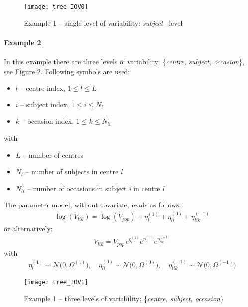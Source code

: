\begin{figure}[htb!]
\centering
  \texttt{[image: tree\_IOV0]}
 \caption{Example 1 -- single level of variability: \textit{subject}-- level}
 \label{tree_IOV0}
\end{figure}

\paragraph{Example 2}
In this example there are three levels of variability: \{\textit{centre, subject, occasion}\}, see Figure \ref{tree_IOV1}. Following symbols are used:
\begin{itemize}
\item
$l$ -- centre index, $1\le l \le L$
\item
$i$ -- subject index, $1\le i \le N_l$
\item
$k$ -- occasion index, $1\le k \le N_{li}$
\end{itemize} 
with
\begin{itemize}
\item
$L$ -- number of centres
\item
$N_l$ -- number of subjects in centre \textit{l}
\item
$N_{li}$ -- number of occasions in subject \textit{i} in centre \textit{l}
\end{itemize} 
The parameter model, without covariate, reads as follows:
\begin{align*}
& \log(V_{lik}) = \log(V_{pop}) + \eta_l^{(1)} + \eta_{li}^{(0)} + \eta_{lik}^{(-1)}  
\end{align*} 
or alternatively:
\begin{align*}
& V_{lik} = V_{pop} \, e^{\eta_l^{(1)}} e^{\eta_{li}^{(0)}} e^{\eta_{lik}^{(-1)}}  
\end{align*} 
with
\begin{align*}
 & \eta_l^{(1)} \sim \mathcal{N}\big(0,\Omega^{(1)}\big), \quad \eta_{li}^{(0)} \sim \mathcal{N}\big(0,\Omega^{(0)}\big),
\quad \eta_{lik}^{(-1)} \sim \mathcal{N}\big(0,\Omega^{(-1)}\big) 
\end{align*}


\begin{figure}[htb!]
\centering
  \texttt{[image: tree\_IOV1]}
 \caption{Example 1 -- three levels of variability: \{\textit{centre, subject, occasion}\}}
 \label{tree_IOV1}
\end{figure}



